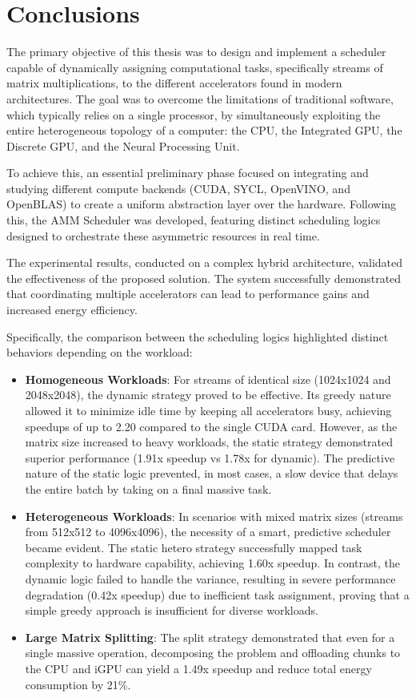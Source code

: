 \chapter{Conclusions}
\label{conclusion}

The primary objective of this thesis was to design and implement a scheduler capable of dynamically assigning computational tasks, specifically streams of matrix multiplications, to the different accelerators found in modern architectures. The goal was to overcome the limitations of traditional software, which typically relies on a single processor, by simultaneously exploiting the entire heterogeneous topology of a computer: the CPU, the Integrated GPU, the Discrete GPU, and the Neural Processing Unit.

To achieve this, an essential preliminary phase focused on integrating and studying different compute backends (CUDA, SYCL, OpenVINO, and OpenBLAS) to create a uniform abstraction layer over the hardware. Following this, the AMM Scheduler was developed, featuring distinct scheduling logics designed to orchestrate these asymmetric resources in real time.

The experimental results, conducted on a complex hybrid architecture, validated the effectiveness of the proposed solution. The system successfully demonstrated that coordinating multiple accelerators can lead to performance gains and increased energy efficiency.

Specifically, the comparison between the scheduling logics highlighted distinct behaviors depending on the workload:

\begin{itemize}
\item \textbf{Homogeneous Workloads}: For streams of identical size (1024x1024 and 2048x2048), the dynamic strategy proved to be effective. Its greedy nature allowed it to minimize idle time by keeping all accelerators busy, achieving speedups of up to 2.20 compared to the single CUDA card. However, as the matrix size increased to heavy workloads, the static strategy demonstrated superior performance (1.91x speedup vs 1.78x for dynamic). The predictive nature of the static logic prevented, in most cases, a slow device that delays the entire batch by taking on a final massive task.

\item \textbf{Heterogeneous Workloads}: In scenarios with mixed matrix sizes (streams from 512x512 to 4096x4096), the necessity of a smart, predictive scheduler became evident. The static hetero strategy successfully mapped task complexity to hardware capability, achieving 1.60x speedup. In contrast, the dynamic logic failed to handle the variance, resulting in severe performance degradation (0.42x speedup) due to inefficient task assignment, proving that a simple greedy approach is insufficient for diverse workloads.

\item \textbf{Large Matrix Splitting}: The split strategy demonstrated that even for a single massive operation, decomposing the problem and offloading chunks to the CPU and iGPU can yield a 1.49x speedup and reduce total energy consumption by 21\%.
\end{itemize}

